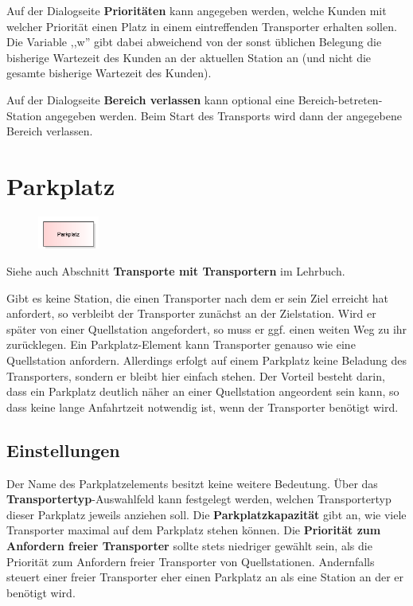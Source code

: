 Auf der Dialogseite \textbf{Prioritäten} kann angegeben werden, welche
Kunden mit welcher Priorität einen Platz in einem eintreffenden
Transporter erhalten sollen.
Die Variable ,,w'' gibt dabei abweichend von der sonst üblichen Belegung die bisherige
Wartezeit des Kunden an der aktuellen Station an (und nicht die gesamte bisherige
Wartezeit des Kunden).

Auf der Dialogseite \textbf{Bereich verlassen} kann optional eine
Bereich-betreten-Station angegeben werden. Beim Start des Transports
wird dann der angegebene Bereich verlassen.


\section{Parkplatz}
\label{ref:ModelElementTransportParking}

\begin{figure}
\vspace{-22pt}
\includegraphics[width=2cm]{imageModelElementTransportParking.png}
\vspace{-22pt}
\end{figure}

Siehe auch Abschnitt \textbf{Transporte mit Transportern} im Lehrbuch.

Gibt es keine Station, die einen Transporter nach dem er sein Ziel erreicht hat
anfordert, so verbleibt der Transporter zunächst an der Zielstation. Wird er später
von einer Quellstation angefordert, so muss er ggf. einen weiten Weg zu ihr zurücklegen.
Ein Parkplatz-Element kann Transporter genauso wie eine Quellstation anfordern.
Allerdings erfolgt auf einem Parkplatz keine Beladung des Transporters, sondern er
bleibt hier einfach stehen. Der Vorteil besteht darin, dass ein Parkplatz deutlich
näher an einer Quellstation angeordent sein kann, so dass keine lange Anfahrtzeit
notwendig ist, wenn der Transporter benötigt wird.

\subsection*{Einstellungen}

Der Name des Parkplatzelements besitzt keine weitere Bedeutung.
Über das \textbf{Transportertyp}-Auswahlfeld kann festgelegt werden, welchen
Transportertyp dieser Parkplatz jeweils anziehen soll. Die \textbf{Parkplatzkapazität}
gibt an, wie viele Transporter maximal auf dem Parkplatz stehen können.
Die \textbf{Priorität zum Anfordern freier Transporter} sollte stets niedriger
gewählt sein, als die Priorität zum Anfordern freier Transporter von Quellstationen.
Andernfalls steuert einer freier Transporter eher einen Parkplatz an als eine
Station an der er benötigt wird.


